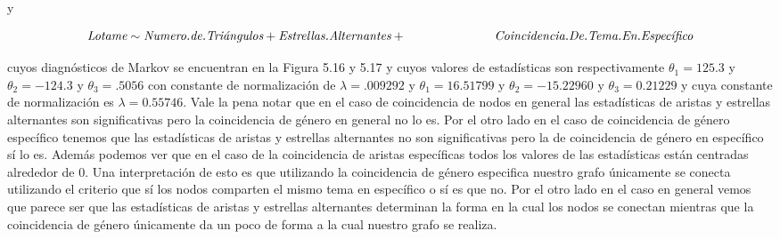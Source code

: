 y

\begin{equation*}
    \textit{Lotame} \sim \textit{Numero.de.Triángulos}+\textit{Estrellas.Alternantes}+
    
    \newline
    \hspace*{2.5cm} \textit{Coincidencia.De.Tema.En.Específico}
\end{equation*}

cuyos diagnósticos de Markov se encuentran en la Figura 5.16 y 5.17 y cuyos valores de estadísticas son respectivamente $\theta_1 = 125.3$ y $\theta_2 = -124.3$ y $\theta_3 = .5056$ con constante de normalización de $\lambda = .009292$ y $\theta_1 = 16.51799$ y $\theta_2 = -15.22960$ y $\theta_3 = 0.21229$ y cuya constante de normalización es $\lambda = 0.55746$. Vale la pena notar que en el caso de coincidencia de nodos en general las estadísticas de aristas y estrellas alternantes son significativas pero la coincidencia de género en general no lo es. Por el otro lado en el caso de coincidencia de género específico tenemos que las estadísticas de aristas y estrellas alternantes no son significativas pero la de coincidencia de género en específico sí lo es. Además podemos ver que en el caso de la coincidencia de aristas específicas todos los valores de las estadísticas están centradas alrededor de 0. Una interpretación de esto es que utilizando la coincidencia de género especifica nuestro grafo únicamente se conecta utilizando el criterio que sí los nodos comparten el mismo tema en específico o sí es que no. Por el otro lado en el caso en general vemos que parece ser que las estadísticas de aristas y estrellas alternantes determinan la forma en la cual los nodos se conectan mientras que la coincidencia de género únicamente da un poco de forma a la cual nuestro grafo se realiza.

